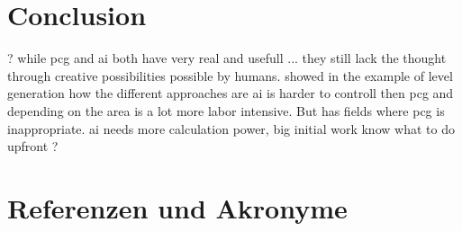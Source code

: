 \documentclass[10pt,a4paper]{article}
\begin{document}
\section{Conclusion}

?
while pcg and ai both have very real and usefull ... they still lack the thought through creative possibilities possible by humans.
showed in the example of level generation how the different approaches are
ai is harder to controll then \gls{pcg} and depending on the area is a lot more labor intensive. But has fields where \gls{pcg} is inappropriate.
ai needs more calculation power, big initial work
know what to do upfront
?

\section{Referenzen und Akronyme}

\printglossaries


%
%

%


\listoffigures
\listoftables

\end{document}
